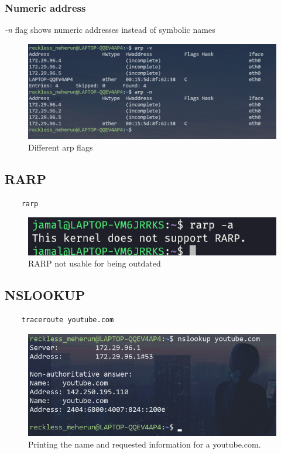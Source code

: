 \documentclass[11pt]{article}
\begin{document}
\subsubsection*{Numeric address}
\emph{-n} flag shows numeric addresses instead of symbolic names
\begin{figure}[H]
\centering
\includegraphics[width=\textwidth]{res/arp 2.png}
\caption{Different arp flags}
\end{figure}

\subsection{RARP}
\begin{verbatim}
	rarp
\end{verbatim}
\begin{figure}[H]
\centering
\includegraphics[width=\textwidth]{res/rarp 1.png}
\caption{RARP not usable for being outdated}
\end{figure}

\subsection{NSLOOKUP}
\begin{verbatim}
	traceroute youtube.com
\end{verbatim}
\begin{figure}[H]
\centering
\includegraphics[width=\textwidth]{res/nslookup 1.png}
\caption{Printing the name and requested information for a youtube.com.}
\end{figure}
\end{document}
